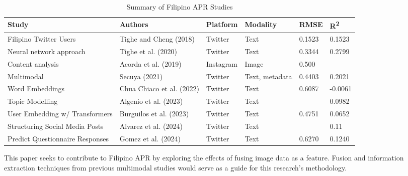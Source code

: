\begin{table}[ht]
\scriptsize
\centering
\caption{Summary of Filipino APR Studies}
\label{tab:filipino_apr_summary}
\begin{tabularx}{\textwidth}{@{}l l l l l l@{}}
\toprule
\textbf{Study} & \textbf{Authors} & \textbf{Platform} & \textbf{Modality} & \textbf{RMSE} & \textbf{R\textsuperscript{2}} \\
\midrule
Filipino Twitter Users & Tighe and Cheng (2018) & Twitter & Text & 0.1523 & 0.1523 \\
Neural network approach & Tighe et al. (2020) & Twitter & Text & 0.3344 & 0.2799 \\
Content analysis & Acorda et al. (2019) & Instagram & Image & 0.500 &  \\
Multimodal & Secuya (2021) & Twitter & Text, metadata & 0.4403 & 0.2021 \\
Word Embeddings & Chua Chiaco et al. (2022) & Twitter & Text & 0.6087 & -0.0061 \\
Topic Modelling & Algenio et al. (2023) & Twitter & Text &  & 0.0982 \\
User Embedding w/ Transformers & Burguilos et al. (2023) & Twitter & Text & 0.4751 & 0.0652 \\
Structuring Social Media Posts & Alvarez et al. (2024) & Twitter & Text &  & 0.11 \\
Predict Questionnaire Responses & Gomez et al. (2024) & Twitter & Text & 0.6270 & 0.1240 \\
\bottomrule
\end{tabularx}
\end{table}

This paper seeks to contribute to Filipino APR by exploring the effects of fusing image data as a feature. Fusion and information extraction techniques from previous multimodal studies would serve as a guide for this research’s methodology.




